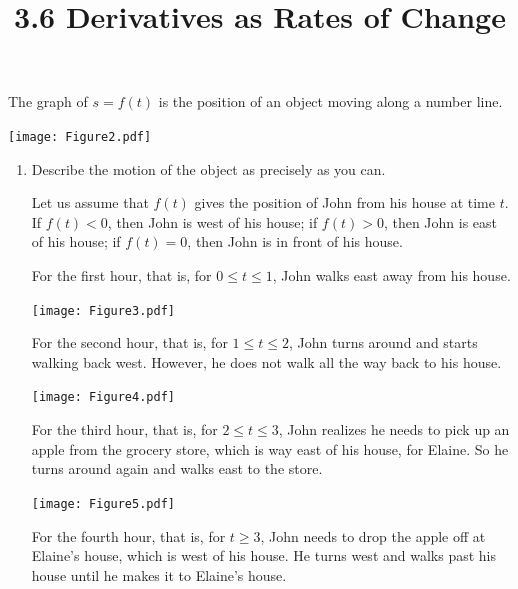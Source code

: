 \documentclass[nooutcomes,handout]{ximera}
\title{3.6 Derivatives as Rates of Change}
\begin{document}
\begin{abstract}		\end{abstract}
\maketitle


\begin{problem}
The graph of $s=f(t)$ is the position of an object moving along a number line.
	\begin{image}
	\texttt{[image: Figure2.pdf]}
	\end{image}
	
	\begin{enumerate}
	
	\item  Describe the motion of the object as precisely as you can.
		\begin{freeResponse}
		Let us assume that $f(t)$ gives the position of John from his house at time $t$.  If $f(t) < 0$, then John is west of his house;  if $f(t) > 0$, then John is east of his house; if $f(t)=0$, then John is in front of his house.  
		
		For the first hour, that is, for $0 \leq t \leq 1$, John walks east away from his house.
		
		\begin{image}
		\texttt{[image: Figure3.pdf]}
		\end{image}
	
		For the second hour, that is, for $1 \leq t \leq 2$, John turns around and starts walking back west.  However, he does not walk all the way back to his house.
		
		\begin{image}
		\texttt{[image: Figure4.pdf]}
		\end{image}
		
		For the third hour, that is, for $2\le t\le 3$, John realizes he needs to pick up an apple from the grocery store, which is way east of his house, for Elaine.  So he turns around again and walks east to the store.
		
		\begin{image}
		\texttt{[image: Figure5.pdf]}
		\end{image}
		
		For the fourth hour, that is, for $t \ge 3$, John needs to drop the apple off at Elaine's house, which is west of his house.  He turns west and walks past his house until he makes it to Elaine's house.
		

\end{freeResponse}
\end{enumerate}
\end{problem}
\end{document}
